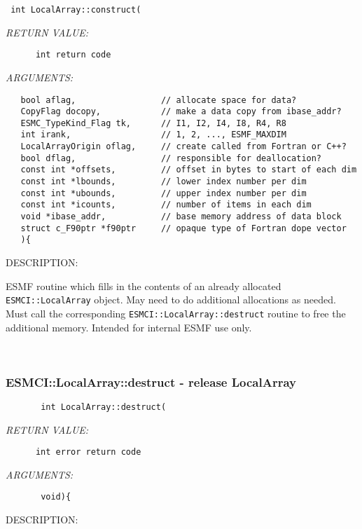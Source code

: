   
\begin{verbatim} int LocalArray::construct(\end{verbatim}{\em RETURN VALUE:}
\begin{verbatim}      int return code\end{verbatim}{\em ARGUMENTS:}
\begin{verbatim}   bool aflag,                 // allocate space for data?
   CopyFlag docopy,            // make a data copy from ibase_addr?
   ESMC_TypeKind_Flag tk,      // I1, I2, I4, I8, R4, R8
   int irank,                  // 1, 2, ..., ESMF_MAXDIM
   LocalArrayOrigin oflag,     // create called from Fortran or C++?
   bool dflag,                 // responsible for deallocation?
   const int *offsets,         // offset in bytes to start of each dim
   const int *lbounds,         // lower index number per dim
   const int *ubounds,         // upper index number per dim
   const int *icounts,         // number of items in each dim
   void *ibase_addr,           // base memory address of data block
   struct c_F90ptr *f90ptr     // opaque type of Fortran dope vector
   ){\end{verbatim}
{\sf DESCRIPTION:\\ }


    ESMF routine which fills in the contents of an already allocated
    {\tt ESMCI::LocalArray} object.  May need to do additional allocations
    as needed.  Must call the corresponding {\tt ESMCI::LocalArray::destruct}
    routine to free the additional memory.  Intended for internal
    ESMF use only.
   
 
\mbox{}\hrulefill\
 
\subsubsection [ESMCI::LocalArray::destruct] {ESMCI::LocalArray::destruct - release LocalArray}


  
\begin{verbatim}       int LocalArray::destruct(\end{verbatim}{\em RETURN VALUE:}
\begin{verbatim}      int error return code\end{verbatim}{\em ARGUMENTS:}
\begin{verbatim}       void){\end{verbatim}
{\sf DESCRIPTION:\\ }


